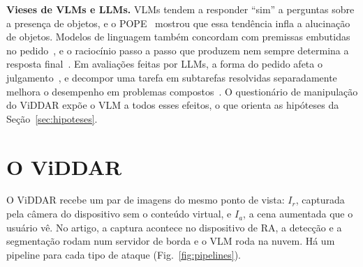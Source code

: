 \documentclass[conference]{IEEEtran}
\newcommand{\Ir}{I_r}
\newcommand{\Ia}{I_a}
\begin{document}
\textbf{Vieses de VLMs e LLMs.} VLMs tendem a responder ``sim'' a perguntas sobre a presença de
objetos, e o POPE~\cite{pope} mostrou que essa tendência infla a alucinação de objetos. Modelos de
linguagem também concordam com premissas embutidas no pedido~\cite{sharma2024}, e o raciocínio passo a
passo que produzem nem sempre determina a resposta final~\cite{turpin2023}. Em avaliações feitas por
LLMs, a forma do pedido afeta o julgamento~\cite{zheng2023}, e decompor uma tarefa em subtarefas
resolvidas separadamente melhora o desempenho em problemas compostos~\cite{khot2023}. O questionário de
manipulação do ViDDAR expõe o VLM a todos esses efeitos, o que orienta as hipóteses da
Seção~\ref{sec:hipoteses}.

\section{O ViDDAR}
\label{sec:viddar}

O ViDDAR recebe um par de imagens do mesmo ponto de vista: $\Ir$, capturada pela câmera do dispositivo
sem o conteúdo virtual, e $\Ia$, a cena aumentada que o usuário vê. No artigo, a captura acontece no
dispositivo de RA, a detecção e a segmentação rodam num servidor de borda e o VLM roda na nuvem. Há um
pipeline para cada tipo de ataque (Fig.~\ref{fig:pipelines}).
\end{document}
